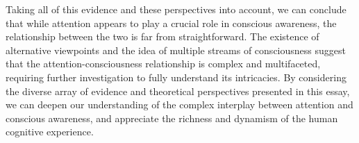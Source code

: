 \documentclass[10pt]{article}
\begin{document}
\begin{sloppypar}
  Taking all of this evidence and these perspectives into account, we can conclude that while attention appears to play a crucial role in conscious awareness, the relationship between the two is far from straightforward. The existence of alternative viewpoints and the idea of multiple streams of consciousness suggest that the attention-consciousness relationship is complex and multifaceted, requiring further investigation to fully understand its intricacies. By considering the diverse array of evidence and theoretical perspectives presented in this essay, we can deepen our understanding of the complex interplay between attention and conscious awareness, and appreciate the richness and dynamism of the human cognitive experience.

  \pagebreak
  \singlespacing %
  
  

\end{sloppypar}
\end{document}

